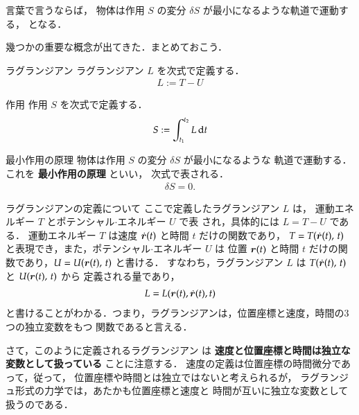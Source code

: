             言葉で言うならば，
            物体は作用 $S$ の変分 $\delta S$ が最小になるような軌道で運動する，
            となる．

            幾つかの重要な概念が出てきた．まとめておこう．
                \begin{myshadebox}{ラグランジアン}
                    ラグランジアン $L$ を次式で定義する．
                        \begin{align}
                            L := T-U
                        \end{align}
                \end{myshadebox}
                \begin{myshadebox}{作用}
                    作用 $S$ を次式で定義する．
                        \begin{align}
                            S := \int_{t_{1}}^{t_{2}}L \,\mathrm{d} t
                        \end{align}
                \end{myshadebox}
                \begin{myshadebox}{最小作用の原理}
                    物体は作用 $S$ の変分 $\delta S$ が最小になるような
                    軌道で運動する．これを \textbf{最小作用の原理} といい，
                    次式で表される．
                    \begin{align}\label{s_sigo}
                        \delta S = 0.
                    \end{align}
                \end{myshadebox}

            \begin{memo}{ラグランジアンの定義について}
                ここで定義したラグランジアン $L$ は，
                運動エネルギー $T$ とポテンシャル$\cdot$エネルギー $U$ で表
                され，具体的には $L=T-U$ である．
                運動エネルギー $T$ は速度 $\dot{\boldsymbol{r}}(t)$ と時間 $t$ だけの関数であり，
                $T=T(\dot{\boldsymbol{r}}(t),\,t)$ と表現でき，また，ポテンシャル$\cdot$エネルギー $U$ は
                位置 $\boldsymbol{r}(t)$ と時間 $t$ だけの関数であり，$U=U(\boldsymbol{r}(t),\,t)$ と書ける．
                すなわち，ラグランジアン $L$ は $T(\dot{\boldsymbol{r}}(t),\,t)$ と $U(\boldsymbol{r}(t),\,t)$ から
                定義される量であり，
                    \begin{align}
                        L =L (\boldsymbol{r}(t),\dot{\boldsymbol{r}}(t),t)
                    \end{align}
                と書けることがわかる．つまり，ラグランジアンは，位置座標と速度，時間の3つの独立変数をもつ
                関数であると言える．

                さて，このように定義されるラグランジアン
                は \textbf{速度と位置座標と時間は独立な変数として扱っている} ことに注意する．
                速度の定義は位置座標の時間微分であって，従って，
                位置座標や時間とは独立ではないと考えられるが，
                ラグランジュ形式の力学では，あたかも位置座標と速度と
                時間が互いに独立な変数として扱うのである．
            \end{memo}

